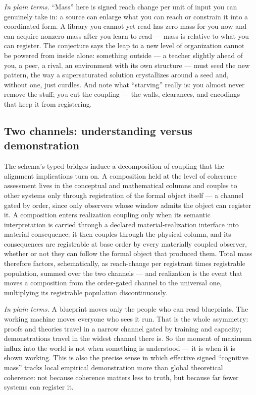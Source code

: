 \documentclass[11pt]{article}
\theoremstyle{definition}
\newcommand{\plainterms}{\emph{In plain terms.}}
\begin{document}
\noindent\plainterms{} ``Mass'' here is signed reach change per unit of input you can genuinely take in: a source can enlarge what you can reach or constrain it into a coordinated form. A library you cannot yet read has zero mass for you now and can acquire nonzero mass after you learn to read --- mass is relative to what you can register. The conjecture says the leap to a new level of organization cannot be powered from inside alone: something outside --- a teacher slightly ahead of you, a peer, a rival, an environment with its own structure --- must seed the new pattern, the way a supersaturated solution crystallizes around a seed and, without one, just curdles. And note what ``starving'' really is: you almost never remove the stuff; you cut the coupling --- the walls, clearances, and encodings that keep it from registering.

\subsection{Two channels: understanding versus demonstration}

The schema's typed bridges induce a decomposition of coupling that the alignment implications turn on. A composition held at the level of coherence assessment lives in the conceptual and mathematical columns and couples to other systems only through registration of the formal object itself --- a channel gated by order, since only observers whose window admits the object can register it. A composition enters realization coupling only when its semantic interpretation is carried through a declared material-realization interface into material consequence; it then couples through the physical column, and its consequences are registrable at base order by every materially coupled observer, whether or not they can follow the formal object that produced them. Total mass therefore factors, schematically, as reach-change per registrant times registrable population, summed over the two channels --- and realization is the event that moves a composition from the order-gated channel to the universal one, multiplying its registrable population discontinuously.

\noindent\plainterms{} A blueprint moves only the people who can read blueprints. The working machine moves everyone who sees it run. That is the whole asymmetry: proofs and theories travel in a narrow channel gated by training and capacity; demonstrations travel in the widest channel there is. So the moment of maximum influx into the world is not when something is understood --- it is when it is shown working. This is also the precise sense in which effective signed ``cognitive mass'' tracks local empirical demonstration more than global theoretical coherence: not because coherence matters less to truth, but because far fewer systems can register it.
\end{document}
